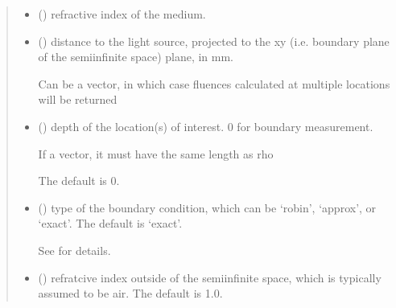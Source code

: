 \documentclass[letterpaper,10pt,english]{sphinxmanual}
\begin{document}
\begin{fulllineitems}
\begin{quote}
\begin{description}
\begin{itemize}
\item {} 
\sphinxAtStartPar
{} () \textendash{} refractive index of the medium.

\item {} 
\sphinxAtStartPar
{} () \textendash{} 
\sphinxAtStartPar
distance to the light source, projected to the x\sphinxhyphen{}y (i.e. boundary plane of the semi\sphinxhyphen{}infinite space) plane, in mm.

\sphinxAtStartPar
Can be a vector, in which case fluences calculated at multiple locations will be returned


\item {} 
\sphinxAtStartPar
{} (\sphinxstyleliteralemphasis{\sphinxupquote{, }}) \textendash{} 
\sphinxAtStartPar
depth of the location(s) of interest. 0 for boundary measurement.

\sphinxAtStartPar
If a vector, it must have the same length as rho

\sphinxAtStartPar
The default is 0.


\item {} 
\sphinxAtStartPar
{} (\sphinxstyleliteralemphasis{\sphinxupquote{, }}) \textendash{} 
\sphinxAtStartPar
type of the boundary condition, which can be ‘robin’, ‘approx’, or ‘exact’. The default is ‘exact’.

\sphinxAtStartPar
See {\hyperref[\detokenize{_autosummary/nirfasterff.utils.boundary_attenuation:nirfasterff.utils.boundary_attenuation}]{}} for details.


\item {} 
\sphinxAtStartPar
{} (\sphinxstyleliteralemphasis{\sphinxupquote{, }}) \textendash{} refratcive index outside of the semi\sphinxhyphen{}infinite space, which is typically assumed to be air. The default is 1.0.


\end{itemize}
\end{description}
\end{quote}
\end{fulllineitems}
\end{document}
